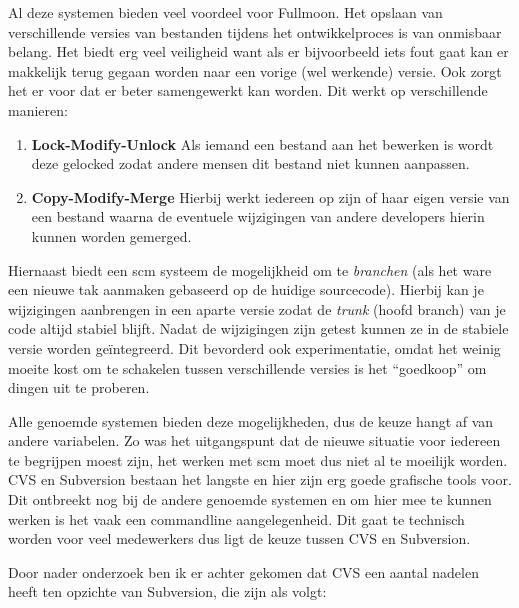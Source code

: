 \documentclass[12pt,a4paper]{article}
\begin{document}
    Al deze systemen bieden veel voordeel voor Fullmoon. Het opslaan van verschillende versies van bestanden tijdens het ontwikkelproces is van onmisbaar belang. Het biedt erg veel veiligheid want als er bijvoorbeeld iets fout gaat kan er makkelijk terug gegaan worden naar een vorige (wel werkende) versie. Ook zorgt het er voor dat er beter samengewerkt kan worden. Dit werkt op verschillende manieren:
    
    \begin{enumerate}
      \item \textbf{Lock-Modify-Unlock} Als iemand een bestand aan het bewerken is wordt deze gelocked zodat andere mensen dit bestand niet kunnen aanpassen.
      \item \textbf{Copy-Modify-Merge} Hierbij werkt iedereen op zijn of haar eigen versie van een bestand waarna de eventuele wijzigingen van andere developers hierin kunnen worden gemerged. 
    \end{enumerate}
    
    Hiernaast biedt een {\sc scm} systeem de mogelijkheid om te \emph{branchen} (als het ware een nieuwe tak aanmaken gebaseerd op de huidige sourcecode). Hierbij kan je wijzigingen aanbrengen in een aparte versie zodat de \emph{trunk} (hoofd branch) van je code altijd stabiel blijft. Nadat de wijzigingen zijn getest kunnen ze in de stabiele versie worden ge\"{i}ntegreerd. Dit bevorderd ook experimentatie, omdat het weinig moeite kost om te schakelen tussen verschillende versies is het ``goedkoop'' om dingen uit te proberen.
    
    Alle genoemde systemen bieden deze mogelijkheden, dus de keuze hangt af van andere variabelen. Zo was het uitgangspunt dat de nieuwe situatie voor iedereen te begrijpen moest zijn, het werken met {\sc scm} moet dus niet al te moeilijk worden. CVS en Subversion bestaan het langste en hier zijn erg goede grafische tools voor. Dit ontbreekt nog bij de andere genoemde systemen en om hier mee te kunnen werken is het vaak een commandline aangelegenheid. Dit gaat te technisch worden voor veel medewerkers dus ligt de keuze tussen CVS en Subversion.
    
    Door nader onderzoek ben ik er achter gekomen dat CVS een aantal nadelen heeft ten opzichte van Subversion, die zijn als volgt:
    
\end{document}
